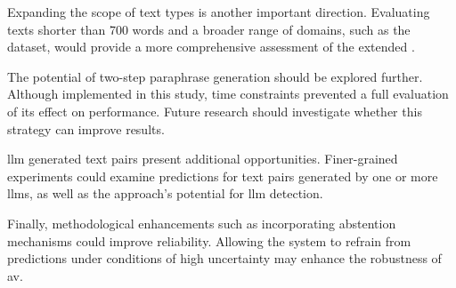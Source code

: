 Expanding the scope of text types is another important direction. 
Evaluating texts shorter than 700 words and a broader range of domains, such as the \dataPan{} dataset, would provide a more comprehensive assessment of the extended \impAppr{}.  

The potential of two-step paraphrase generation should be explored further. 
Although implemented in this study, time constraints prevented a full evaluation of its effect on \impAppr{} performance. 
Future research should investigate whether this strategy can improve results.  

\ac{llm} generated text pairs present additional opportunities. Finer-grained experiments could examine predictions for text pairs generated by one or more \acp{llm}, as well as the approach's potential for \ac{llm} detection.  

Finally, methodological enhancements such as incorporating abstention mechanisms could improve reliability. 
Allowing the system to refrain from predictions under conditions of high uncertainty may enhance the robustness of \ac{av}.  
